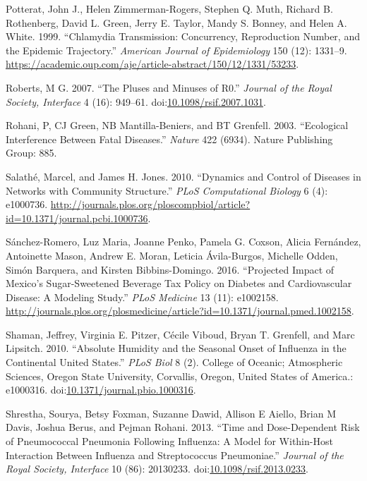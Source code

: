 \documentclass[]{article}
\theoremstyle{definition}
\theoremstyle{definition}
\theoremstyle{definition}
\theoremstyle{remark}
\begin{document}
\hypertarget{ref-potterat99}{}
Potterat, John J., Helen Zimmerman-Rogers, Stephen Q. Muth, Richard B.
Rothenberg, David L. Green, Jerry E. Taylor, Mandy S. Bonney, and Helen
A. White. 1999. ``Chlamydia Transmission: Concurrency, Reproduction
Number, and the Epidemic Trajectory.'' \emph{American Journal of
Epidemiology} 150 (12): 1331--9.
\url{https://academic.oup.com/aje/article-abstract/150/12/1331/53233}.

\hypertarget{ref-roberts07}{}
Roberts, M G. 2007. ``The Pluses and Minuses of R0.'' \emph{Journal of
the Royal Society, Interface} 4 (16): 949--61.
doi:\href{https://doi.org/10.1098/rsif.2007.1031}{10.1098/rsif.2007.1031}.

\hypertarget{ref-rohani03}{}
Rohani, P, CJ Green, NB Mantilla-Beniers, and BT Grenfell. 2003.
``Ecological Interference Between Fatal Diseases.'' \emph{Nature} 422
(6934). Nature Publishing Group: 885.

\hypertarget{ref-salathe10}{}
Salathé, Marcel, and James H. Jones. 2010. ``Dynamics and Control of
Diseases in Networks with Community Structure.'' \emph{PLoS
Computational Biology} 6 (4): e1000736.
\url{http://journals.plos.org/ploscompbiol/article?id=10.1371/journal.pcbi.1000736}.

\hypertarget{ref-sanchez-romero16}{}
Sánchez-Romero, Luz Maria, Joanne Penko, Pamela G. Coxson, Alicia
Fernández, Antoinette Mason, Andrew E. Moran, Leticia Ávila-Burgos,
Michelle Odden, Simón Barquera, and Kirsten Bibbins-Domingo. 2016.
``Projected Impact of Mexico's Sugar-Sweetened Beverage Tax Policy on
Diabetes and Cardiovascular Disease: A Modeling Study.'' \emph{PLoS
Medicine} 13 (11): e1002158.
\url{http://journals.plos.org/plosmedicine/article?id=10.1371/journal.pmed.1002158}.

\hypertarget{ref-shaman10}{}
Shaman, Jeffrey, Virginia E. Pitzer, Cécile Viboud, Bryan T. Grenfell,
and Marc Lipsitch. 2010. ``Absolute Humidity and the Seasonal Onset of
Influenza in the Continental United States.'' \emph{PLoS Biol} 8 (2).
College of Oceanic; Atmospheric Sciences, Oregon State University,
Corvallis, Oregon, United States of America.: e1000316.
doi:\href{https://doi.org/10.1371/journal.pbio.1000316}{10.1371/journal.pbio.1000316}.

\hypertarget{ref-shrestha13}{}
Shrestha, Sourya, Betsy Foxman, Suzanne Dawid, Allison E Aiello, Brian M
Davis, Joshua Berus, and Pejman Rohani. 2013. ``Time and Dose-Dependent
Risk of Pneumococcal Pneumonia Following Influenza: A Model for
Within-Host Interaction Between Influenza and Streptococcus
Pneumoniae.'' \emph{Journal of the Royal Society, Interface} 10 (86):
20130233.
doi:\href{https://doi.org/10.1098/rsif.2013.0233}{10.1098/rsif.2013.0233}.
\end{document}
